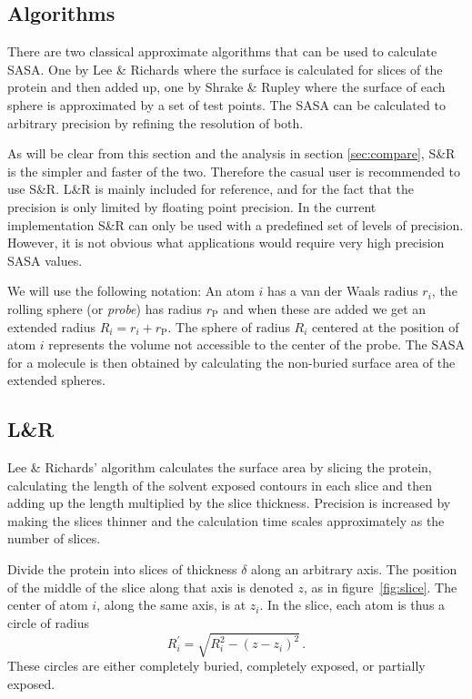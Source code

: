 \documentclass[a4paper,11pt]{article}
\begin{document}
\begin{small}

\section{Algorithms}\label{sec:alg}

There are two classical approximate algorithms that can be used to
calculate SASA. One by Lee \& Richards \cite{LnR} where the surface is
calculated for slices of the protein and then added up, one by Shrake
\& Rupley \cite{SnR} where the surface of each sphere is approximated
by a set of test points. The SASA can be calculated to arbitrary
precision by refining the resolution of both. 

As will be clear from this section and the analysis in section
\ref{sec:compare}, S\&R is the simpler and faster of the
two. Therefore the casual user is recommended to use S\&R. L\&R is
mainly included for reference, and for the fact that the precision is
only limited by floating point precision. In the current
implementation S\&R can only be used with a predefined set of levels
of precision. However, it is not obvious what applications would
require very high precision SASA values.

We will use the following notation: An atom $i$ has a van der Waals
radius $r_i$, the rolling sphere (or \emph{probe}) has radius
$r_\text{P}$ and when these are added we get an extended radius $R_i =
r_i + r_\text{P}$. The sphere of radius $R_i$ centered at the position
of atom $i$ represents the volume not accessible to the center of the
probe. The SASA for a molecule is then obtained by calculating the
non-buried surface area of the extended spheres.

\subsection{L\&R} \label{sec:alg_LnR}

Lee \& Richards' algorithm calculates the surface area by slicing the
protein, calculating the length of the solvent exposed contours in
each slice and then adding up the length multiplied by the slice
thickness. Precision is increased by making the slices thinner and the
calculation time scales approximately as the number of slices.

Divide the protein into slices of thickness $\delta$ along an
arbitrary axis. The position of the middle of the slice along that
axis is denoted $z$, as in figure~\ref{fig:slice}. The center of atom
$i$, along the same axis, is at $z_i$. In the slice, each atom is thus
a circle of radius $$R_i^\prime = \sqrt{R_i^2-(z-z_i)^2}\,.$$ These
circles are either completely buried, completely exposed, or partially
exposed.


\end{small}
\end{document}
